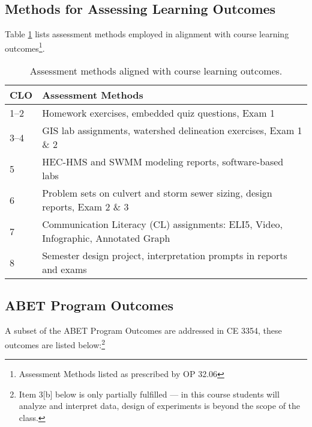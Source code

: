 \documentclass[12pt]{article}
\begin{document}
\subsection*{Methods for Assessing Learning Outcomes}
Table \ref{tab:assessment} lists assessment methods employed in alignment with course learning outcomes\footnote{Assessment Methods listed as prescribed by OP 32.06}.
\begin{table}[h!]
\caption{Assessment methods aligned with course learning outcomes.}
\centering
\begin{tabular}{|p{0.5in}|p{5.5in}|}
\hline
\textbf{CLO} & \textbf{Assessment Methods} \\
\hline
1--2 & Homework exercises, embedded quiz questions, Exam 1 \\
\hline
3--4 & GIS lab assignments, watershed delineation exercises, Exam 1 \& 2 \\
\hline
5 & HEC-HMS and SWMM modeling reports, software-based labs \\
\hline
6 & Problem sets on culvert and storm sewer sizing, design reports, Exam 2 \& 3 \\
\hline
7 & Communication Literacy (CL) assignments: ELI5, Video, Infographic, Annotated Graph \\
\hline
8 & Semester design project, interpretation prompts in reports and exams \\
\hline
\end{tabular}

   \label{tab:assessment}
\end{table}

\subsection*{ABET Program Outcomes}
A subset of the ABET Program Outcomes are addressed in CE 3354, these outcomes are listed below:\footnote{Item 3[b] below is only partially fulfilled --- in this course students will analyze and interpret data, design of experiments is beyond the scope of the class.}
\end{document}
